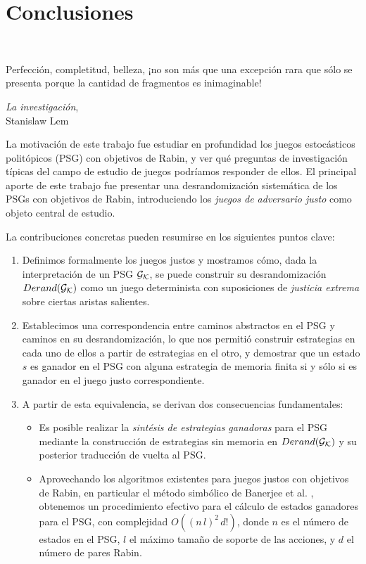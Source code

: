 \chapter{Conclusiones}
~\label{cap:conclusions}
\vspace{-1cm}
\epigraph{Perfección, completitud, belleza, ¡no son más que una excepción rara que sólo se presenta porque la cantidad de fragmentos es inimaginable!}{\textit{La investigación}, \\ Stanislaw Lem}

La motivación de este trabajo fue estudiar en profundidad los juegos
estocásticos politópicos (PSG) con objetivos de Rabin, y ver qué preguntas de
investigación típicas del campo de estudio de juegos podríamos responder de
ellos. El principal aporte de este trabajo fue presentar una desrandomización
sistemática de los PSGs con objetivos de Rabin, introduciendo los \emph{juegos
	de adversario justo} como objeto central de estudio.

La contribuciones concretas pueden resumirse en los siguientes puntos clave:

\begin{enumerate}
	\item Definimos formalmente los juegos justos y mostramos cómo, dada la
	      interpretación de un PSG $\mathcal{G}_{\mathcal{K}}$, se puede construir su desrandomización $Derand(\mathcal{G}_{\mathcal{K}})$
	      como un juego determinista con suposiciones de \emph{justicia extrema} sobre
	      ciertas aristas salientes.
	\item Establecimos una correspondencia entre caminos abstractos en el PSG y caminos
	      en su desrandomización, lo que nos permitió construir estrategias en cada uno
	      de ellos a partir de estrategias en el otro, y demostrar que un estado $s$ es
	      ganador en el PSG con alguna estrategia de memoria finita si y sólo si es
	      ganador en el juego justo correspondiente.
	\item A partir de esta equivalencia, se derivan dos consecuencias fundamentales:
	      \begin{itemize}
		      \item Es posible realizar la \emph{sintésis de estrategias ganadoras} para el PSG
		            mediante la construcción de estrategias sin memoria en $Derand(\mathcal{G}_{\mathcal{K}})$ y su posterior
		            traducción de vuelta al PSG.
		      \item Aprovechando los algoritmos existentes para juegos justos con objetivos de
		            Rabin, en particular el método simbólico de Banerjee et al. \cite{Banerjee},
		            obtenemos un procedimiento efectivo para el cálculo de estados ganadores para
		            el PSG, con complejidad $O((n\,l)^2\,d!)$, donde $n$ es el número de estados en
		            el PSG, $l$ el máximo tamaño de soporte de las acciones, y $d$ el número de
		            pares Rabin.
	      \end{itemize}
\end{enumerate}

